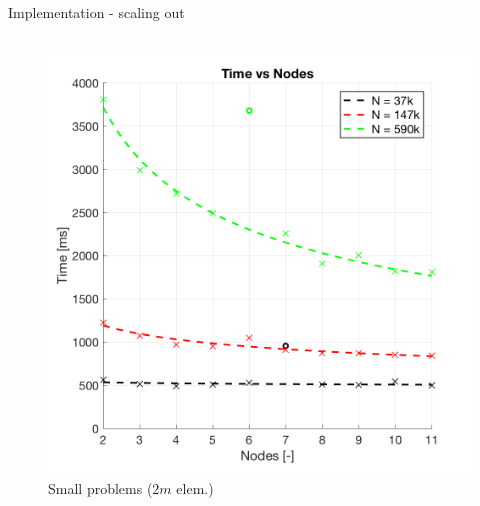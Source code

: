 \documentclass[c]{beamer}
\begin{document}
\begin{frame}{Implementation - scaling out}

\begin{columns}
  \begin{column}{0.5\textwidth}
  \begin{figure}
      \centering
      \includegraphics[width=1\textwidth]{img/TotalTimeVsNodeCount_SMALL.png}
      \caption{\tiny Small problems ($2m$ elem.)}
    \end{figure}
  \end{column}


\end{columns}
\end{frame}
\end{document}
